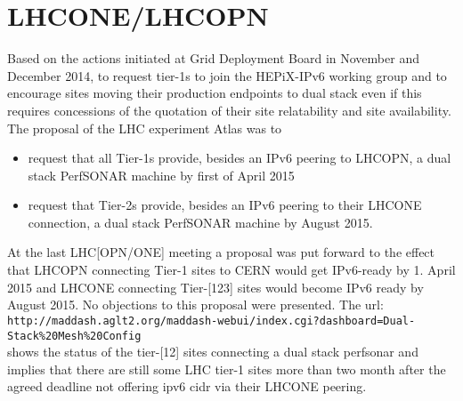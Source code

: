 \section{LHCONE/LHCOPN}
Based on the actions initiated at Grid Deployment Board in November and December 2014, to request tier-1s to join the HEPiX-IPv6 working group and to encourage sites moving their production endpoints to dual stack even if this requires concessions of the quotation of their site relatability and site availability. The proposal of the LHC experiment Atlas was to
\begin{itemize}
 \item request that all Tier-1s provide,
	besides an IPv6 peering to LHCOPN,
        a dual stack PerfSONAR machine by first of April 2015
 \item request that Tier-2s provide,
        besides an IPv6 peering to their LHCONE connection,
        a dual stack PerfSONAR machine by August 2015.
\end{itemize}
At the last LHC[OPN/ONE] meeting a proposal was put forward to the effect that
LHCOPN connecting Tier-1 sites to CERN would get IPv6-ready by 1. April 2015 and
LHCONE connecting Tier-[123] sites would become IPv6 ready by August 2015.
No objections to this proposal were presented. The url:\\
{\tt\small http://maddash.aglt2.org/maddash-webui/index.cgi?dashboard=Dual-Stack\%20Mesh\%20Config}\\ shows the status of the tier-[12] sites connecting a dual stack perfsonar and implies that there are still some LHC tier-1 sites more than two month after the agreed deadline not offering ipv6 cidr via their LHCONE peering.

